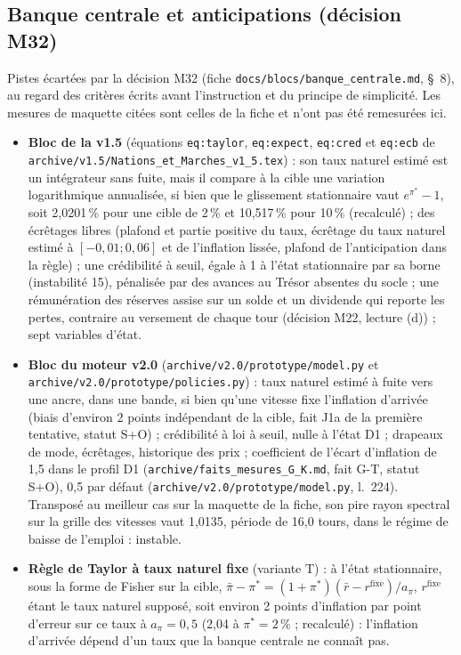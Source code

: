 \documentclass[11pt,a4paper]{article}
\begin{document}
\subsection*{Banque centrale et anticipations (décision M32)}
Pistes écartées par la décision M32 (fiche \nolinkurl{docs/blocs/banque_centrale.md}, \S~8), au regard des critères écrits avant l'instruction et du principe de simplicité. Les mesures de maquette citées sont celles de la fiche et n'ont pas été remesurées ici.
\begin{itemize}
\item \textbf{Bloc de la v1.5} (équations \texttt{eq:taylor}, \texttt{eq:expect}, \texttt{eq:cred} et \texttt{eq:ecb} de \nolinkurl{archive/v1.5/Nations_et_Marches_v1_5.tex}) : son taux naturel estimé est un intégrateur sans fuite, mais il compare à la cible une variation logarithmique annualisée, si bien que le glissement stationnaire vaut $e^{\pi^\ast} - 1$, soit 2,0201\,\% pour une cible de 2\,\% et 10,517\,\% pour 10\,\% (recalculé) ; des écrêtages libres (plafond et partie positive du taux, écrêtage du taux naturel estimé à $[-0{,}01 ; 0{,}06]$ et de l'inflation lissée, plafond de l'anticipation dans la règle) ; une crédibilité à seuil, égale à 1 à l'état stationnaire par sa borne (instabilité 15), pénalisée par des avances au Trésor absentes du socle ; une rémunération des réserves assise sur un solde et un dividende qui reporte les pertes, contraire au versement de chaque tour (décision M22, lecture (d)) ; sept variables d'état.
\item \textbf{Bloc du moteur v2.0} (\nolinkurl{archive/v2.0/prototype/model.py} et \nolinkurl{archive/v2.0/prototype/policies.py}) : taux naturel estimé à fuite vers une ancre, dans une bande, si bien qu'une vitesse fixe l'inflation d'arrivée (biais d'environ 2 points indépendant de la cible, fait J1a de la première tentative, statut S+O) ; crédibilité à loi à seuil, nulle à l'état D1 ; drapeaux de mode, écrêtages, historique des prix ; coefficient de l'écart d'inflation de 1,5 dans le profil D1 (\nolinkurl{archive/faits_mesures_G_K.md}, fait G-T, statut S+O), 0,5 par défaut (\nolinkurl{archive/v2.0/prototype/model.py}, l.~224). Transposé au meilleur cas sur la maquette de la fiche, son pire rayon spectral sur la grille des vitesses vaut 1,0135, période de 16,0 tours, dans le régime de baisse de l'emploi : instable.
\item \textbf{Règle de Taylor à taux naturel fixe} (variante T) : à l'état stationnaire, sous la forme de Fisher sur la cible, $\bar\pi - \pi^\ast = (1 + \pi^\ast)(\bar r - r^{\mathrm{fixe}})/a_\pi$, $r^{\mathrm{fixe}}$ étant le taux naturel supposé, soit environ 2 points d'inflation par point d'erreur sur ce taux à $a_\pi = 0{,}5$ (2,04 à $\pi^\ast = 2\,\%$ ; recalculé) : l'inflation d'arrivée dépend d'un taux que la banque centrale ne connaît pas.

\end{itemize}
\end{document}
